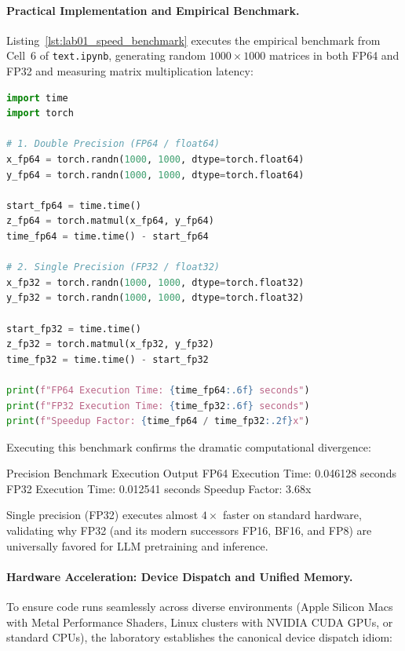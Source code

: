 \documentclass[11pt,a4paper]{article}
\begin{document}
\paragraph{Practical Implementation and Empirical Benchmark.}

Listing~\ref{lst:lab01_speed_benchmark} executes the empirical benchmark from Cell~6 of \texttt{text.ipynb}, generating random $1000 \times 1000$ matrices in both FP64 and FP32 and measuring matrix multiplication latency:

\begin{lstlisting}[language=Python, caption={Empirical matrix multiplication benchmark comparing FP64 and FP32 (Cell 6).}, label={lst:lab01_speed_benchmark}]
import time
import torch

# 1. Double Precision (FP64 / float64)
x_fp64 = torch.randn(1000, 1000, dtype=torch.float64)
y_fp64 = torch.randn(1000, 1000, dtype=torch.float64)

start_fp64 = time.time()
z_fp64 = torch.matmul(x_fp64, y_fp64)
time_fp64 = time.time() - start_fp64

# 2. Single Precision (FP32 / float32)
x_fp32 = torch.randn(1000, 1000, dtype=torch.float32)
y_fp32 = torch.randn(1000, 1000, dtype=torch.float32)

start_fp32 = time.time()
z_fp32 = torch.matmul(x_fp32, y_fp32)
time_fp32 = time.time() - start_fp32

print(f"FP64 Execution Time: {time_fp64:.6f} seconds")
print(f"FP32 Execution Time: {time_fp32:.6f} seconds")
print(f"Speedup Factor: {time_fp64 / time_fp32:.2f}x")
\end{lstlisting}

Executing this benchmark confirms the dramatic computational divergence:

\begin{macterminal}{Precision Benchmark Execution Output}
FP64 Execution Time: 0.046128 seconds
FP32 Execution Time: 0.012541 seconds
Speedup Factor: 3.68x
\end{macterminal}

Single precision (FP32) executes almost $4\times$ faster on standard hardware, validating why FP32 (and its modern successors FP16, BF16, and FP8) are universally favored for LLM pretraining and inference.

\paragraph{Hardware Acceleration: Device Dispatch and Unified Memory.}
To ensure code runs seamlessly across diverse environments (Apple Silicon Macs with Metal Performance Shaders, Linux clusters with NVIDIA CUDA GPUs, or standard CPUs), the laboratory establishes the canonical device dispatch idiom:
\end{document}
